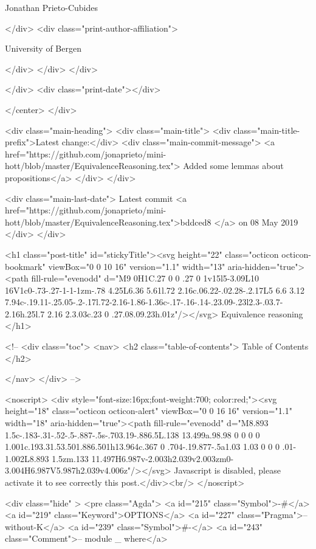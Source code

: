                   Jonathan Prieto-Cubides
                
              </div>
              <div class="print-author-affiliation">
                
                  University of Bergen
                
                </div>
            </div>
          </div>
          
          
        </div>
        <div class="print-date"></div>
        
        
    </center>
  </div>

  
  <div class="main-heading">
    <div class="main-title">
      <div class="main-title-prefix">Latest change:</div>
      <div class="main-commit-message">
            <a href="https://github.com/jonaprieto/mini-hott/blob/master/EquivalenceReasoning.tex">
              Added some lemmas about propositions</a>
      </div>
    </div>

    <div class="main-last-date">
      Latest commit <a href="https://github.com/jonaprieto/mini-hott/blob/master/EquivalenceReasoning.tex">bddced8 </a> on  08 May 2019
    </div>
  </div>
  
  <h1 class="post-title" id="stickyTitle"><svg height="22" class="octicon octicon-bookmark" viewBox="0 0 10 16" version="1.1" width="13" aria-hidden="true"><path fill-rule="evenodd" d="M9 0H1C.27 0 0 .27 0 1v15l5-3.09L10 16V1c0-.73-.27-1-1-1zm-.78 4.25L6.36 5.61l.72 2.16c.06.22-.02.28-.2.17L5 6.6 3.12 7.94c-.19.11-.25.05-.2-.17l.72-2.16-1.86-1.36c-.17-.16-.14-.23.09-.23l2.3-.03.7-2.16h.25l.7 2.16 2.3.03c.23 0 .27.08.09.23h.01z"/></svg> Equivalence reasoning
  </h1>

  <!-- 
  <div class="toc">
    <nav>
    <h2 class="table-of-contents"> Table of Contents </h2>
      

    </nav>
  </div>
   -->

  <noscript>
  <div style="font-size:16px;font-weight:700; color:red;"><svg height="18" class="octicon octicon-alert" viewBox="0 0 16 16" version="1.1" width="18" aria-hidden="true"><path fill-rule="evenodd" d="M8.893 1.5c-.183-.31-.52-.5-.887-.5s-.703.19-.886.5L.138 13.499a.98.98 0 0 0 0 1.001c.193.31.53.501.886.501h13.964c.367 0 .704-.19.877-.5a1.03 1.03 0 0 0 .01-1.002L8.893 1.5zm.133 11.497H6.987v-2.003h2.039v2.003zm0-3.004H6.987V5.987h2.039v4.006z"/></svg> Javascript is disabled, please activate it to see correctly this post.</div><br/>
  </noscript>

  <div class="hide" >
<pre class="Agda">
<a id="215" class="Symbol">{-#</a> <a id="219" class="Keyword">OPTIONS</a> <a id="227" class="Pragma">--without-K</a> <a id="239" class="Symbol">#-}</a>
<a id="243" class="Comment">-- module _ where</a>

